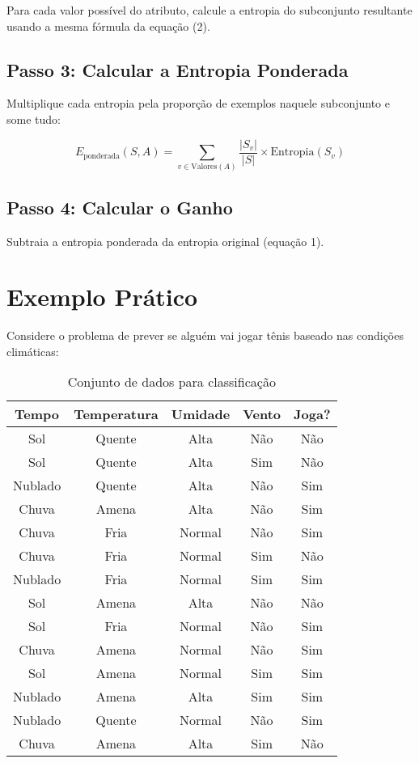 \documentclass[12pt,a4paper]{article}
\begin{document}
Para cada valor possível do atributo, calcule a entropia do subconjunto resultante usando a mesma fórmula da equação (2).

\subsection{Passo 3: Calcular a Entropia Ponderada}

Multiplique cada entropia pela proporção de exemplos naquele subconjunto e some tudo:

\begin{equation}
E_{\text{ponderada}}(S, A) = \sum_{v \in \text{Valores}(A)} \frac{|S_v|}{|S|} \times \text{Entropia}(S_v)
\end{equation}

\subsection{Passo 4: Calcular o Ganho}

Subtraia a entropia ponderada da entropia original (equação 1).

\section{Exemplo Prático}

Considere o problema de prever se alguém vai jogar tênis baseado nas condições climáticas:

\begin{table}[h]
\centering
\small
\begin{tabular}{ccccc}
\toprule
Tempo & Temperatura & Umidade & Vento & Joga? \\
\midrule
Sol & Quente & Alta & Não & Não \\
Sol & Quente & Alta & Sim & Não \\
Nublado & Quente & Alta & Não & Sim \\
Chuva & Amena & Alta & Não & Sim \\
Chuva & Fria & Normal & Não & Sim \\
Chuva & Fria & Normal & Sim & Não \\
Nublado & Fria & Normal & Sim & Sim \\
Sol & Amena & Alta & Não & Não \\
Sol & Fria & Normal & Não & Sim \\
Chuva & Amena & Normal & Não & Sim \\
Sol & Amena & Normal & Sim & Sim \\
Nublado & Amena & Alta & Sim & Sim \\
Nublado & Quente & Normal & Não & Sim \\
Chuva & Amena & Alta & Sim & Não \\
\bottomrule
\end{tabular}
\caption{Conjunto de dados para classificação}
\end{table}
\end{document}
